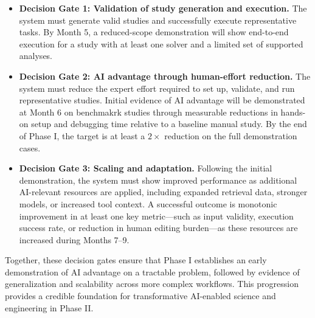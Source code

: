 \documentclass[11pt]{article} \usepackage[margin=1in]{geometry}
\begin{document}
\begin{itemize}[leftmargin=1.2em,itemsep=0.2em,topsep=0.2em]

\item \textbf{Decision Gate 1: Validation of study generation and execution.}
The system must generate valid studies and successfully execute
representative tasks. By Month 5, a reduced-scope demonstration will show 
end-to-end execution for a study with at least one solver and a limited set of supported analyses. %

\item \textbf{Decision Gate 2: AI advantage through human-effort reduction.}
The system must reduce the expert effort required to set up, validate, and run
representative studies. Initial evidence of AI advantage will be demonstrated
at Month 6 on benchmakrk studies through measurable reductions in
hands-on setup and debugging time relative to a baseline manual study. By
the end of Phase I, the target is at least a $2\times$ reduction on the full
demonstration cases.

\item \textbf{Decision Gate 3: Scaling and adaptation.}
Following the initial demonstration, the system must show improved performance
as additional AI-relevant resources are applied, including expanded retrieval
data, stronger models, or increased tool context. A successful outcome is
monotonic improvement in at least one key metric---such as input validity,
execution success rate, or reduction in human editing burden---as these
resources are increased during Months 7--9.

\end{itemize}

Together, these decision gates ensure that Phase I establishes an early
demonstration of AI advantage on a tractable problem, followed by evidence of
generalization and scalability across more complex workflows. This progression
provides a credible foundation for transformative AI-enabled science and
engineering in Phase II.
\end{document}
